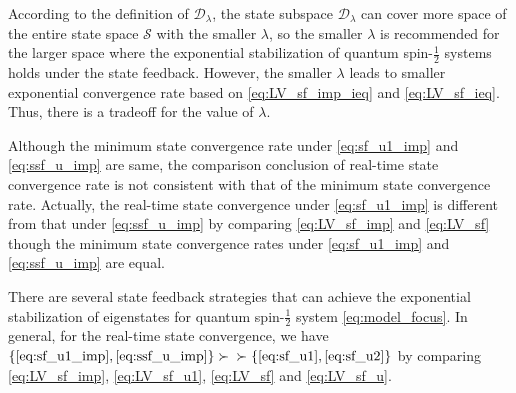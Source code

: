 \documentclass[]{elsarticle}
\begin{document}
\begin{rmk}
	According to the definition of $\mathcal{D}_\lambda$, the state subspace $\mathcal{D}_\lambda$ can cover more space of the entire state space $\mathcal{S}$ with the smaller $\lambda$, so the smaller $\lambda$ is recommended for the larger space where the exponential stabilization of quantum spin-$\frac{1}{2}$ systems holds under the state feedback. However, the smaller $\lambda$ leads to smaller exponential convergence rate based on \eqref{eq:LV_sf_imp_ieq} and \eqref{eq:LV_sf_ieq}. Thus, there is a tradeoff for the value of $\lambda$. 
\end{rmk}
\begin{rmk}
	Although the minimum state convergence rate under \eqref{eq:sf_u1_imp} and \eqref{eq:ssf_u_imp}  are same, the comparison conclusion of real-time state convergence rate is not consistent with that of the minimum state convergence rate. Actually, the real-time state convergence under \eqref{eq:sf_u1_imp} is different from that under \eqref{eq:ssf_u_imp} by comparing \eqref{eq:LV_sf_imp} and \eqref{eq:LV_sf} though the minimum state convergence rates under \eqref{eq:sf_u1_imp} and \eqref{eq:ssf_u_imp} are equal.
\end{rmk}
\begin{rmk}\label{rmk:2}
	There are several state feedback strategies that can achieve the exponential stabilization of eigenstates for quantum spin-$\frac{1}{2}$ system \eqref{eq:model_focus}. In general, for the real-time state convergence, we have $\{\eqref{eq:sf_u1_imp}, \eqref{eq:ssf_u_imp}\}\succ$ \cite{WSJZJ2021b} $\succ\{\eqref{eq:sf_u1}, \eqref{eq:sf_u2}\}$ by comparing \eqref{eq:LV_sf_imp}, \eqref{eq:LV_sf_u1}, \eqref{eq:LV_sf} and \eqref{eq:LV_sf_u}.
\end{rmk}
\end{document}
